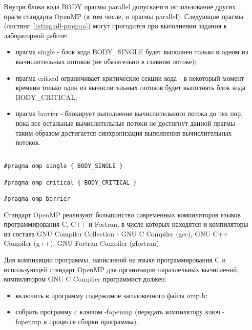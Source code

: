 Внутри блока кода BODY прагмы parallel допускается использование других прагм стандарта OpenMP (в том числе, и прагмы parallel). Следующие прагмы (листинг \ref{listing:all-pragma}) могут пригодится при выполнении задания к лабораторной работе:

\begin{itemize}

	\item прагма single - блок кода BODY\_SINGLE будет выполнен только в одном из вычислительных потоков (не обязательно в главном потоке);
	\item прагма critical ограничивает критические секции кода - в некоторый момент времени только один из вычислительных потоков будет выполнять блок кода BODY\_CRITICAL;
	\item прагма barrier - блокирует выполнение вычислительного потока до тех пор, пока все остальные вычислительные потоки не достигнут данной прагмы - таким образом достигается синхронизация выполнения вычислительных потоков.

\end{itemize}

\begin{lstlisting}

#pragma omp single { BODY_SINGLE }

#pragma omp critical { BODY_CRITICAL }

#pragma omp barrier

\end{lstlisting}
\mylistingend


Стандарт OpenMP реализуют большинство современных компиляторов языков программирования C, C++ и Fortran, в числе которых находятся и компиляторы из состава GNU Compiler Collection - GNU C Compiler (gcc), GNU C++ Compiler (g++), GNU Fortran Compiler (gfortran).

Для компиляции программы, написанной на языке программирования C и использующей стандарт OpenMP для организации параллельных вычислений, компилятором GNU C Compiler программист должен:

\begin{itemize}

	\item включить в программу содержимое заголовочного файла omp.h;
	\item собрать программу с ключом -fopenmp (передать компилятору ключ -fopenmp в процессе сборки программы).

\end{itemize}

